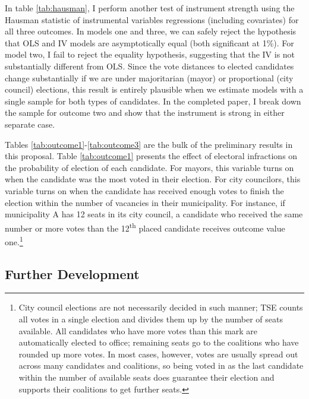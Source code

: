 \documentclass[11pt]{article}
\begin{document}


In table \ref{tab:hausman}, I perform another test of instrument strength using the Hausman statistic of instrumental variables regressions (including covariates) for all three outcomes. In models one and three, we can safely reject the hypothesis that OLS and IV models are asymptotically equal (both significant at 1\%). For model two, I fail to reject the equality hypothesis, suggesting that the IV is not substantially different from OLS. Since the vote distances to elected candidates change substantially if we are under majoritarian (mayor) or proportional (city council) elections, this result is entirely plausible when we estimate models with a single sample for both types of candidates. In the completed paper, I break down the sample for outcome two and show that the instrument is strong in either separate case.

Tables \ref{tab:outcome1}-\ref{tab:outcome3} are the bulk of the preliminary results in this proposal. Table \ref{tab:outcome1} presents the effect of electoral infractions on the probability of election of each candidate. For mayors, this variable turns on when the candidate was the most voted in their election. For city councilors, this variable turns on when the candidate has received enough votes to finish the election within the number of vacancies in their municipality. For instance, if municipality A has 12 seats in its city council, a candidate who received the same number or more votes than the 12\textsuperscript{th} placed candidate receives outcome value one.\footnote{City council elections are not necessarily decided in such manner; TSE counts all votes in a single election and divides them up by the number of seats available. All candidates who have more votes than this mark are automatically elected to office; remaining seats go to the coalitions who have rounded up more votes. In most cases, however, votes are usually spread out across many candidates and coalitions, so being voted in as the last candidate within the number of available seats does guarantee their election and supports their coalitions to get further seats.}







\subsection{Further Development} \label{subsec:conclusion_paper1}
\end{document}
